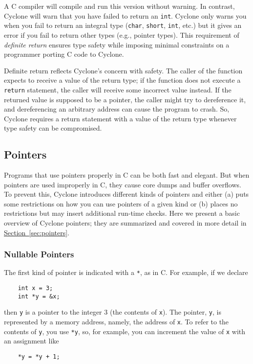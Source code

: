 A C compiler will compile and run this version without warning.  
In contrast, Cyclone will warn that you have failed to return
an \texttt{int}.  Cyclone only warns you when you fail to return
an integral type (\texttt{char}, \texttt{short}, \texttt{int}, etc.) 
but it gives an error if you fail to return
other types (e.g., pointer types).  This requirement of
\emph{definite return} ensures type safety while imposing
minimal constraints on a programmer porting C code to Cyclone.

Definite return reflects Cyclone's concern with safety.  The caller of
the function expects to receive a value of the return type; if the
function does not execute a \texttt{return} statement, the caller will
receive some incorrect value instead.  If the returned value is supposed
to be a pointer, the caller might try to dereference it, and
dereferencing an arbitrary address can cause the program to crash.  So,
Cyclone requires a return statement with a value of the return
type whenever type safety can be compromised.  

\subsection{Pointers}

Programs that use pointers properly in C can be both fast and elegant.
But when pointers are used improperly in C, they cause core dumps and
buffer overflows.  To prevent this, Cyclone introduces different kinds
of pointers and either (a) puts some restrictions on how you can use pointers
of a given kind or (b) places no restrictions but may insert additional
run-time checks.  Here we present a basic overview of Cyclone
pointers; they are summarized and covered in more detail in
\hyperref[{sec:pointers}]{Section~\ref{sec:pointers}}.

\subsubsection*{Nullable Pointers}

The first kind of pointer is indicated with a \texttt{*}, as in C\@.  For
example, if we declare
\begin{verbatim}
    int x = 3;
    int *y = &x;
\end{verbatim}
then \texttt{y} is a pointer to the integer 3 (the contents of
\texttt{x}).  The pointer, \texttt{y}, is represented by a memory
address, namely, the address of \texttt{x}.  To refer to the contents
of \texttt{y}, you use \texttt{*y}, so, for example, you can increment
the value of \texttt{x} with an assignment like
\begin{verbatim}
    *y = *y + 1;
\end{verbatim}

